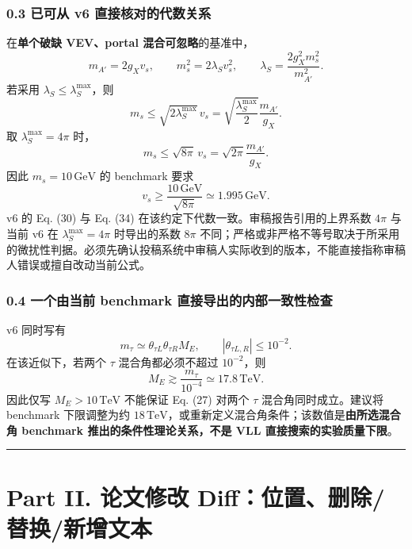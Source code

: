 \documentclass[
]{article}
\begin{document}
\subsubsection{0.3 已可从 v6
直接核对的代数关系}\label{ux5df2ux53efux4ece-v6-ux76f4ux63a5ux6838ux5bf9ux7684ux4ee3ux6570ux5173ux7cfb}

在\textbf{单个破缺 VEV、portal 混合可忽略}的基准中， \[
m_{A'}=2g_Xv_s,\qquad m_s^2=2\lambda_Sv_s^2,
\qquad
\lambda_S=\frac{2g_X^2m_s^2}{m_{A'}^2}.
\] 若采用 \(\lambda_S\leq\lambda_S^{\max}\)，则 \[
m_s\leq\sqrt{2\lambda_S^{\max}}\,v_s
=\sqrt{\frac{\lambda_S^{\max}}{2}}\frac{m_{A'}}{g_X}.
\] 取 \(\lambda_S^{\max}=4\pi\) 时， \[
m_s\leq\sqrt{8\pi}\,v_s
=\sqrt{2\pi}\frac{m_{A'}}{g_X}.
\] 因此 \(m_s=10\,\mathrm{GeV}\) 的 benchmark 要求 \[
v_s\geq\frac{10\,\mathrm{GeV}}{\sqrt{8\pi}}\simeq1.995\,\mathrm{GeV}.
\] v6 的 Eq. (30) 与 Eq. (34) 在该约定下代数一致。审稿报告引用的上界系数
\(4\pi\) 与当前 v6 在 \(\lambda_S^{\max}=4\pi\) 时导出的系数 \(8\pi\)
不同；严格或非严格不等号取决于所采用的微扰性判据。必须先确认投稿系统中审稿人实际收到的版本，不能直接指称审稿人错误或擅自改动当前公式。

\subsubsection{0.4 一个由当前 benchmark
直接导出的内部一致性检查}\label{ux4e00ux4e2aux7531ux5f53ux524d-benchmark-ux76f4ux63a5ux5bfcux51faux7684ux5185ux90e8ux4e00ux81f4ux6027ux68c0ux67e5}

v6 同时写有 \[
m_\tau\simeq\theta_{\tau L}\theta_{\tau R}M_E,\qquad
|\theta_{\tau L,R}|\le10^{-2}.
\] 在该近似下，若两个 \(\tau\) 混合角都必须不超过 \(10^{-2}\)，则 \[
M_E\gtrsim\frac{m_\tau}{10^{-4}}\simeq17.8\,\mathrm{TeV}.
\] 因此仅写 \(M_E>10\,\mathrm{TeV}\) 不能保证 Eq. (27) 对两个 \(\tau\)
混合角同时成立。建议将 benchmark 下限调整为约
\(18\,\mathrm{TeV}\)，或重新定义混合角条件；该数值是\textbf{由所选混合角
benchmark 推出的条件性理论关系，不是 VLL 直接搜索的实验质量下限}。

\begin{center}\rule{0.5\linewidth}{0.5pt}\end{center}

\section{Part II. 论文修改
Diff：位置、删除/替换/新增文本}\label{part-ii.-ux8bbaux6587ux4feeux6539-diffux4f4dux7f6eux5220ux9664ux66ffux6362ux65b0ux589eux6587ux672c}
\end{document}
